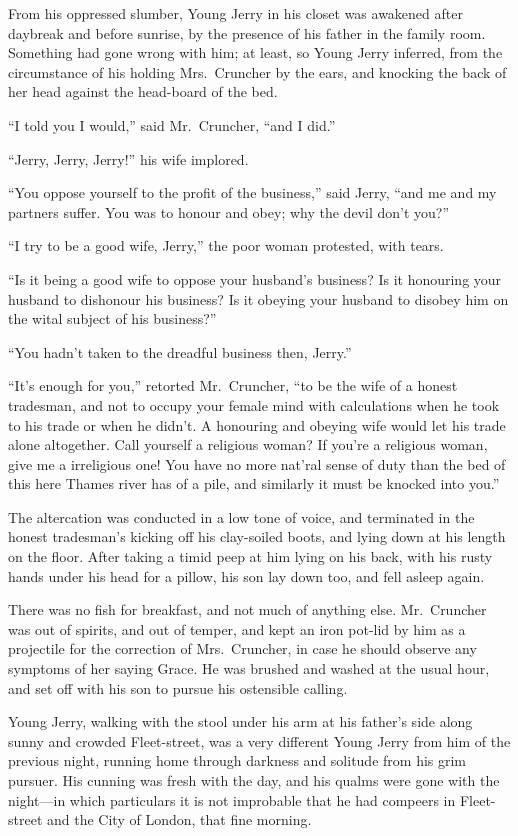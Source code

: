 From his oppressed slumber, Young Jerry in his closet was awakened
after daybreak and before sunrise, by the presence of his father in
the family room.  Something had gone wrong with him; at least, so
Young Jerry inferred, from the circumstance of his holding
Mrs.\ Cruncher by the ears, and knocking the back of her head against
the head-board of the bed.

``I told you I would,'' said Mr.\ Cruncher, ``and I did.''

``Jerry, Jerry, Jerry!'' his wife implored.

``You oppose yourself to the profit of the business,'' said Jerry,
``and me and my partners suffer.  You was to honour and obey;
why the devil don't you?''

``I try to be a good wife, Jerry,'' the poor woman protested, with tears.

``Is it being a good wife to oppose your husband's business?  Is it
honouring your husband to dishonour his business?  Is it obeying your
husband to disobey him on the wital subject of his business?''

``You hadn't taken to the dreadful business then, Jerry.''

``It's enough for you,'' retorted Mr.\ Cruncher, ``to be the wife of a
honest tradesman, and not to occupy your female mind with calculations
when he took to his trade or when he didn't.  A honouring and obeying
wife would let his trade alone altogether.  Call yourself a religious
woman?  If you're a religious woman, give me a irreligious one!
You have no more nat'ral sense of duty than the bed of this here Thames
river has of a pile, and similarly it must be knocked into you.''

The altercation was conducted in a low tone of voice, and terminated
in the honest tradesman's kicking off his clay-soiled boots, and lying
down at his length on the floor.  After taking a timid peep at him
lying on his back, with his rusty hands under his head for a pillow,
his son lay down too, and fell asleep again.

There was no fish for breakfast, and not much of anything else.
Mr.\ Cruncher was out of spirits, and out of temper, and kept an iron
pot-lid by him as a projectile for the correction of Mrs.\ Cruncher,
in case he should observe any symptoms of her saying Grace.  He was
brushed and washed at the usual hour, and set off with his son to
pursue his ostensible calling.

Young Jerry, walking with the stool under his arm at his father's
side along sunny and crowded Fleet-street, was a very different
Young Jerry from him of the previous night, running home through
darkness and solitude from his grim pursuer.  His cunning was fresh
with the day, and his qualms were gone with the night---in which
particulars it is not improbable that he had compeers in Fleet-street
and the City of London, that fine morning.

